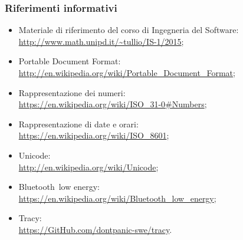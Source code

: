 \documentclass[../AnalisiDeiRequisiti.tex]{subfiles}
\begin{document}
		\subsubsection{Riferimenti informativi}
		\begin{itemize}
			\item Materiale di riferimento del corso di Ingegneria del Software: \\\url{http://www.math.unipd.it/~tullio/IS-1/2015};
			\item Portable Document Format:  \\\url{http://en.wikipedia.org/wiki/Portable_Document_Format};
			\item Rappresentazione dei numeri: \\\url{https://en.wikipedia.org/wiki/ISO_31-0#Numbers};
			\item Rappresentazione di date e orari: \\\url{https://en.wikipedia.org/wiki/ISO_8601};
			\item Unicode\g: \\\url{http://en.wikipedia.org/wiki/Unicode};
			\item Bluetooth\g\ low energy: \\\url{https://en.wikipedia.org/wiki/Bluetooth_low_energy};
			\item Tracy\g: \\\url{https://GitHub.com/dontpanic-swe/tracy}.
		\end{itemize}
\end{document}
